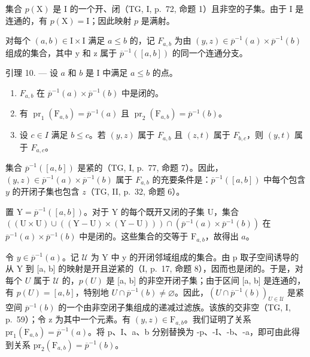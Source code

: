 集合 \(p(\mathrm{X})\) 是 I 的一个开、闭（TG, I, p.~72, 命题 1）且非空的子集。由于 I 是连通的，有 \(p(\mathrm{X}) = \mathrm{I}\)；因此映射 \(p\) 是满射。

对每个 \((a,b)\in\mathrm{I}\times\mathrm{I}\) 满足 \(a\leqslant b\) 的，记 \(F_{a,b}\) 为由 \((y,z)\in\overline{p}^{-1}(a)\times\overline{p}^{-1}(b)\) 组成的集合，其中 y 和 z 属于 \(\overline{p}^{-1}([a,b])\) 的同一个连通分支。

引理 10. --- 设 \(a\) 和 \(b\) 是 I 中满足 \(a \leqslant b\) 的点。

\begin{enumerate}
\def\labelenumi{\alph{enumi})}
\item
  \(F_{a,b}\) 在 \(\overline{p}^{-1}(a)\times\overline{p}^{-1}(b)\) 中是闭的。
\item
  有 \(\operatorname{pr}_1(\mathrm{F}_{a,b}) = \overline{p}^{-1}(a)\) 且 \(\operatorname{pr}_2(\mathrm{F}_{a,b}) = \overline{p}^{-1}(b)\)。
\item
  设 \(c \in I\) 满足 \(b \leqslant c\)。若 \((y,z)\) 属于 \(F_{a,b}\) 且 \((z,t)\) 属于 \(F_{b,c}\)，则 \((y,t)\) 属于 \(F_{a,c}\)。
\end{enumerate}

集合 \(\overline{p}^{-1}([a,b])\) 是紧的（TG, I, p.~77, 命题 7）。因此，\((y,z)\in\overline{p}^{-1}(a)\times\overline{p}^{-1}(b)\) 属于 \(F_{a,b}\) 的充要条件是：\(\overline{p}^{-1}([a,b])\) 中每个包含 \(y\) 的开闭子集也包含 \(z\)（TG, II, p.~32, 命题 6）。

置 \(\mathrm{Y} = \overline{p}^{-1}([a,b])\)。对于 Y 的每个既开又闭的子集 U，集合 \(((\mathrm{U} \times \mathrm{U}) \cup ((\mathrm{Y} - \mathrm{U}) \times (\mathrm{Y} - \mathrm{U}))) \cap (\overline{p}^{-1}(a) \times \overline{p}^{-1}(b))\) 在 \(\overline{p}^{-1}(a) \times \overline{p}^{-1}(b)\) 中是闭的。这些集合的交等于 \(\mathrm{F}_{a,b}\)，故得出 \(a\)。

令 \(y \in \overline{p}^{-1}(a)\)。记 \(\mathcal{U}\) 为 Y 中 y 的开闭邻域组成的集合。由 p 取子空间诱导的从 Y 到 {[}a, b{]} 的映射是开且逆紧的（I, p.~17, 命题 8），因而也是闭的。于是，对每个 \(U\) 属于 \(\mathcal{U}\) 的，\(p(U)\) 是 {[}a, b{]} 的非空开闭子集；由于区间 {[}a, b{]} 是连通的，有 \(p(U) = [a, b]\)，特别地 \(U \cap \overline{p}^{-1}(b) \neq \varnothing\)。因此，\((U \cap \overline{p}^{-1}(b))_{U \in \mathcal{U}}\) 是紧空间 \(\overline{p}^{-1}(b)\) 的一个由非空闭子集组成的递减过滤族。该族的交非空（TG, I, p.~59）；令 z 为其中一个元素。有 \((y, z) \in \mathrm{F}_{a,b}\)。我们证明了关系 \(\mathrm{pr}_{1}(\mathrm{F}_{a,b}) = \overline{p}^{-1}(a)\)。将 p、I、a、b 分别替换为 -p、-I、-b、-a，即可由此得到关系 \(\mathrm{pr}_{2}(\mathrm{F}_{a,b}) = \overline{p}^{-1}(b)\)。

